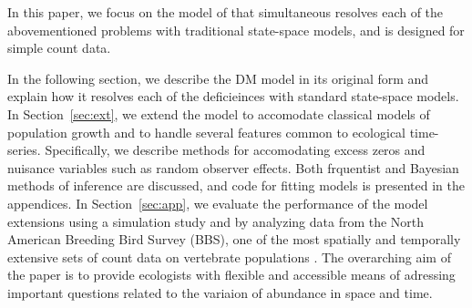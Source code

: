 \documentclass[12pt]{article}
\begin{document}
In this paper, we focus on the model of
\citet{dail_madsen:2011} %
that simultaneous resolves each of the abovementioned problems with
traditional state-space models, and is designed for simple count
data.

In the following section, we describe the DM model in its original
form and explain how it resolves each of the deficieinces with
standard state-space models. In Section~\ref{sec:ext}, we extend the
model to accomodate classical models of population growth and to
handle several features common to ecological
time-series. Specifically, we describe methods for accomodating excess
zeros and nuisance variables such as random observer effects. Both
frquentist and Bayesian methods of inference are discussed, and code
for fitting models is presented in the appendices.
In Section~\ref{sec:app}, we evaluate the performance of the model
extensions using a simulation study and by analyzing data from the
North American Breeding Bird Survey (BBS), one of
the most spatially and temporally extensive sets of count data on
vertebrate populations \citep{robbins_etal:1986}. The overarching aim
of  the paper is to provide ecologists with flexible and accessible means of
adressing important questions related to the variaion of abundance in
space and time.
\end{document}
